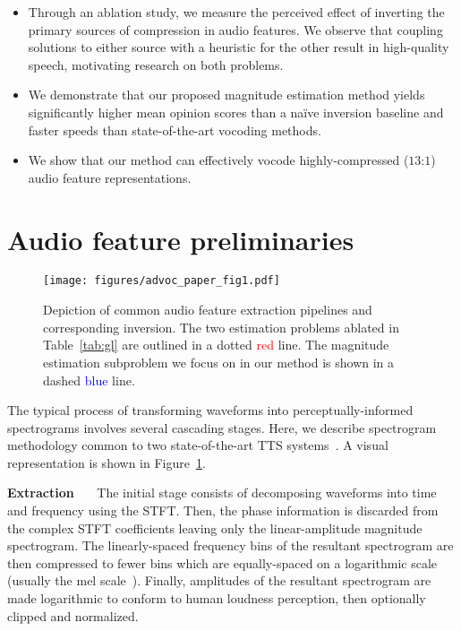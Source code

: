 \documentclass[a4paper]{article}
\begin{document}
\begin{itemize}
    \item Through an ablation study, we measure the perceived effect of inverting the primary sources of compression in audio features. We observe that coupling solutions to either source with a heuristic for the other result in high-quality speech, motivating research on both problems.
    \item We demonstrate that our proposed magnitude estimation method yields significantly higher mean opinion scores than a na\"ive inversion baseline and faster speeds than state-of-the-art vocoding methods.
    \item We show that our method can effectively vocode highly-compressed ($13$:$1$) audio feature representations.
\end{itemize}

\section{Audio feature preliminaries}

\label{sec:feature}
\begin{figure}[t]
    \centering
    \texttt{[image: figures/advoc\_paper\_fig1.pdf]}
    \caption{
    Depiction of common audio feature extraction pipelines and corresponding inversion.
    The two estimation problems ablated in Table~\ref{tab:gl} are outlined in a dotted \textcolor{red}{red} line.
    The magnitude estimation subproblem we focus on in our method is shown in a dashed \textcolor{blue}{blue} line.}
    \label{fig:extract_invert}
\end{figure}

The typical process of transforming waveforms into perceptually-informed spectrograms involves several cascading stages.
Here, we describe spectrogram methodology common to two state-of-the-art TTS systems~\cite{ping2017deep,shen2018natural}. A visual representation is shown in Figure~\ref{fig:extract_invert}.

\textbf{Extraction}~~~
The initial stage consists of decomposing waveforms into time and frequency using the STFT. Then,
the phase information is discarded from the complex STFT coefficients leaving only the linear-amplitude magnitude spectrogram. 
The linearly-spaced frequency bins of the resultant spectrogram are then compressed to fewer bins which are equally-spaced on a logarithmic scale (usually the mel scale~\cite{stevens1937scale}). 
Finally, amplitudes of the resultant spectrogram are made logarithmic to conform to human loudness perception, then optionally clipped and normalized.
\end{document}

